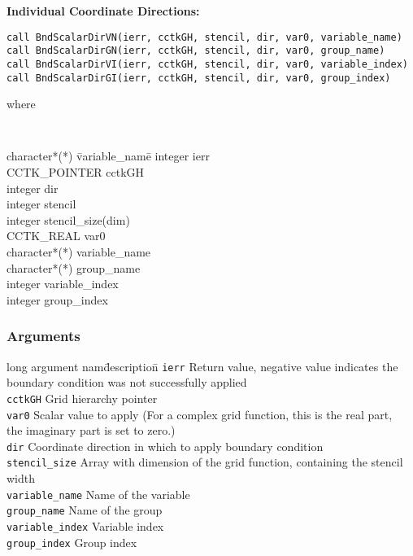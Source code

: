\documentclass{article}
\begin{document}
\noindent
{\bf Individual Coordinate Directions:}
\begin{verbatim}
call BndScalarDirVN(ierr, cctkGH, stencil, dir, var0, variable_name)
call BndScalarDirGN(ierr, cctkGH, stencil, dir, var0, group_name)
call BndScalarDirVI(ierr, cctkGH, stencil, dir, var0, variable_index)
call BndScalarDirGI(ierr, cctkGH, stencil, dir, var0, group_index)
\end{verbatim}
where
{\tt
\begin{tabbing}
character*(*) \= variable\_name\=\kill
integer \> ierr \\
CCTK\_POINTER \> cctkGH\\
integer \> dir\\
integer \> stencil\\
integer \> stencil\_size(dim)\\
CCTK\_REAL \> var0 \\
character*(*) \> variable\_name\\
character*(*) \> group\_name\\
integer \> variable\_index\\
integer \> group\_index
\end{tabbing}
}

\subsubsection*{Arguments}
\begin{tabbing}
long argument nam\= description\=\kill
\texttt{ierr} \> Return value, negative value indicates the
boundary condition was not successfully applied\\
{\tt cctkGH} \> Grid hierarchy pointer\\
{\tt var0} \> Scalar value to apply  (For a complex grid function, this is the real part, \\
\> the imaginary part is set to zero.)\\
{\tt dir} \> Coordinate direction in which to apply boundary condition\\
{\tt stencil\_size} \> Array with dimension of the grid function, containing the stencil width\\
{\tt variable\_name} \> Name of the variable\\
{\tt group\_name} \> Name of the group\\
{\tt variable\_index} \> Variable index\\
{\tt group\_index} \> Group index
\end{tabbing}
\end{document}
